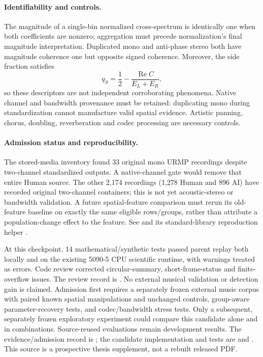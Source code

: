 \paragraph{Identifiability and controls.}
The magnitude of a single-bin normalized cross-spectrum is identically one
when both coefficients are nonzero; aggregation must precede normalization's
final magnitude interpretation. Duplicated mono and anti-phase stereo both
have magnitude coherence one but opposite signed coherence. Moreover,
the side fraction satisfies
\[
 q_S=\frac12-\frac{\operatorname{Re}C}{E_L+E_R},
\]
so these descriptors are not independent corroborating phenomena. Native
channel and bandwidth provenance must be retained: duplicating mono during
standardization cannot manufacture valid spatial evidence. Artistic panning,
chorus, doubling, reverberation and codec processing are necessary controls.

\paragraph{Admission status and reproducibility.}
The stored-media inventory found 33 original mono URMP recordings despite
two-channel standardized outputs. A native-channel gate would remove that
entire Human source. The other 2,174 recordings (1,278 Human and 896 AI) have
recorded original two-channel containers; this is not yet acoustic-stereo
or bandwidth validation. A future spatial-feature comparison must rerun its
old-feature baseline on exactly the same eligible rows/groups, rather than
attribute a population-change effect to the feature. See
and its standard-library reproduction helper
.

At this checkpoint, 14 mathematical/synthetic tests passed parent replay both
locally and on the existing 5090-5 CPU scientific runtime, with warnings treated
as errors. Code review corrected circular-summary, short-frame-status and
finite-overflow issues. The review record is
.
No external musical validation or detection gain is claimed. Admission first
requires a separately frozen external music corpus with paired known spatial
manipulations and unchanged controls, group-aware parameter-recovery tests,
and codec/bandwidth stress tests. Only a subsequent, separately frozen
exploratory experiment could compare this candidate alone and in combinations.
Source-reused evaluations remain development results.
The evidence/admission record is
;
the candidate implementation and tests are
and
.
This source is a prospective thesis supplement, not a rebuilt released PDF.
